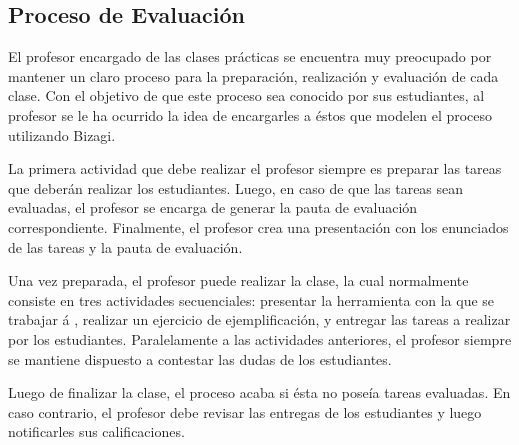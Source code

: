 \documentclass[12pt,letterpaper]{article}
\begin{document}
\subsection{\textbf{Proceso de Evaluación}}
El profesor encargado de las clases prácticas se encuentra muy preocupado por mantener un claro proceso para la preparación, realización y evaluación de cada clase. Con el objetivo de que este proceso sea conocido por sus estudiantes, al profesor se le ha ocurrido la idea de encargarles a éstos que modelen el proceso utilizando Bizagi.
\par La primera actividad que debe realizar el profesor siempre es preparar las tareas que deberán realizar los estudiantes. Luego, en caso de que las tareas sean evaluadas, el profesor se encarga de generar la pauta de evaluación correspondiente. Finalmente, el profesor crea una presentación con los enunciados de las tareas y la pauta de evaluación.
\par Una vez preparada, el profesor puede realizar la clase, la cual normalmente consiste en tres actividades secuenciales: presentar la herramienta con la que se trabajar á , realizar un ejercicio de ejemplificación, y entregar las tareas a realizar por los estudiantes. Paralelamente a las actividades anteriores, el profesor siempre se mantiene dispuesto a contestar las dudas de los estudiantes.
\par Luego de finalizar la clase, el proceso acaba si ésta no poseía tareas evaluadas. En caso contrario, el profesor debe revisar las entregas de los estudiantes y luego notificarles sus calificaciones.\\
\end{document}
